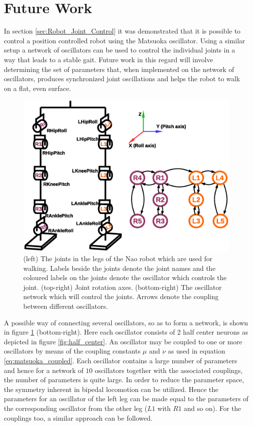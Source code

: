 \documentclass[12pt,twoside]{article}
\theoremstyle{plain}
\theoremstyle{definition}
\theoremstyle{remark}
\newcommand{\forceindent}{\leavevmode{\parindent=2em\indent}}
\begin{document}
\section{Future Work}
\label{sec:Future_Work}
In section \ref{sec:Robot_Joint_Control} it was demonstrated that it is possible to control a position controlled robot using the Matsuoka oscillator. Using a similar setup a network of oscillators can be used to control the individual joints in a way that leads to a stable gait. Future work in this regard will involve determining the set of parameters that, when implemented on the network of oscillators, produces synchronized joint oscillations and helps the robot to walk on a flat, even surface.
\begin{figure}[H]
\centering
\includegraphics[scale=0.5]{figures/future_work_oscillator_network.eps}
\caption{(left) The joints in the legs of the Nao robot which are used for walking. Labels beside the joints denote the joint names and the coloured labels on the joints denote the oscillator which controls the joint. (top-right) Joint rotation axes. (bottom-right) The oscillator network which will  control the joints. Arrows denote the coupling between different oscillators.}
\label{fig:future_work}
\end{figure}
\forceindent A possible way of connecting several oscillators, so as to form a network, is shown in figure \ref{fig:future_work} (bottom-right). Here each oscillator consists of 2 half center neurons as depicted in figure \ref{fig:half_center}. An oscillator may be coupled to one or more oscillators by means of the coupling constants $\mu$ and $\nu$ as used in equation \ref{eq:matsuoka_coupled}. Each oscillator contains a large number of parameters and hence for a network of $10$ oscillators together with the associated couplings, the number of parameters is quite large. In order to reduce the parameter space, the symmetry inherent in bipedal locomotion can be utilized. Hence the parameters for an oscillator of the left leg can be made equal to the parameters of the corresponding oscillator from the other leg ($L1$ with $R1$ and so on). For the couplings too, a similar approach can be followed.\\
\end{document}
